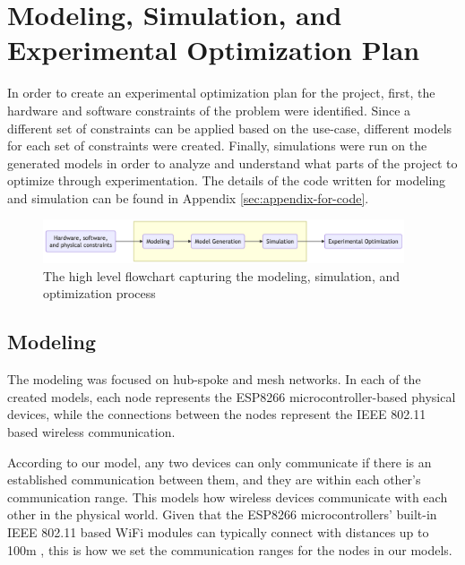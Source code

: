 \section{Modeling, Simulation, and Experimental Optimization Plan}

In order to create an experimental optimization plan for the project, first, the hardware and software constraints of the problem were identified. Since a different set of constraints can be applied based on the use-case, different models for each set of constraints were created. Finally, simulations were run on the generated models in order to analyze and understand what parts of the project to optimize through experimentation. The details of the code written for modeling and simulation can be found in Appendix \ref{sec:appendix-for-code}.

\begin{figure}[H]
    \centering
    \includegraphics[width=0.95\textwidth]{final-proposal/images/mod_sim_flowchart.png}
    \caption{The high level flowchart capturing the modeling, simulation, and optimization process}
    \label{fig:mod-sim-flowchart}

\end{figure}

\subsection{Modeling}
The modeling was focused on hub-spoke and mesh networks. In each of the created models, each node represents the ESP8266 microcontroller-based physical devices, while the connections between the nodes represent the IEEE 802.11 based wireless communication. 


According to our model, any two devices can only communicate if there is an established communication between them, and they are within each other's communication range. This models how wireless devices communicate with each other in the physical world. Given that the ESP8266 microcontrollers' built-in IEEE 802.11 based WiFi modules can typically connect with distances up to 100m \cite{chabukswardesign}, this is how we set the communication ranges for the nodes in our models.


